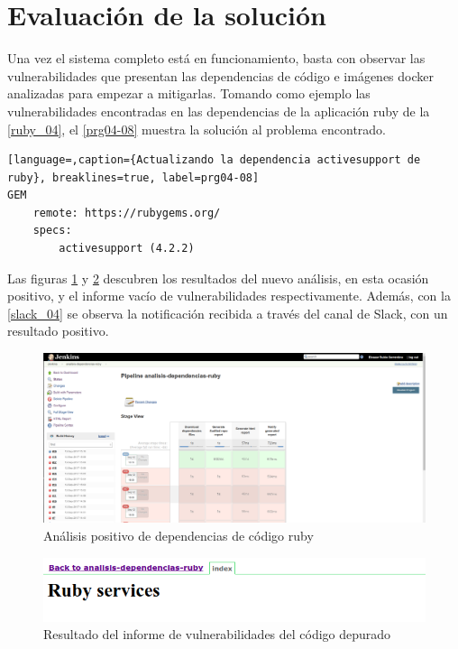 \section{Evaluación de la solución}

Una vez el sistema completo está en funcionamiento, basta con observar las vulnerabilidades que presentan las dependencias de código e imágenes docker analizadas para empezar a mitigarlas. Tomando como ejemplo las vulnerabilidades encontradas en las dependencias de la aplicación ruby de la \autoref{ruby_04}, el \autoref{prg04-08} muestra la solución al problema encontrado.

\begin{lstlisting}[language=,caption={Actualizando la dependencia activesupport de ruby}, breaklines=true, label=prg04-08]
GEM
	remote: https://rubygems.org/
	specs:
		activesupport (4.2.2)
\end{lstlisting}

Las figuras \ref{ruby_05} y \ref{ruby_06} descubren los resultados del nuevo análisis, en esta ocasión positivo, y el informe vacío de vulnerabilidades respectivamente. Además, con la \autoref{slack_04} se observa la notificación recibida a través del canal de Slack, con un resultado positivo.

\begin{figure}[H]
	\centering
	\includegraphics[width=1.00\linewidth]
	{desarrollo/figuras/ruby_05.png}
	\caption{Análisis positivo de dependencias de código ruby}
	\label{ruby_05}
\end{figure}

\begin{figure}[H]
	\centering
	\includegraphics[width=1.00\linewidth]
	{desarrollo/figuras/ruby_06.png}
	\caption{Resultado del informe de vulnerabilidades del código depurado}
	\label{ruby_06}
\end{figure}

